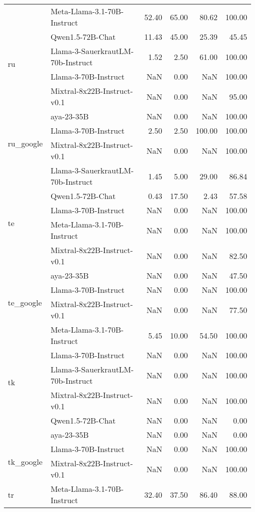 \begin{tabular}{llrrrr}
\cline{1-6}
\multirow[t]{6}{*}{ru} & Meta-Llama-3.1-70B-Instruct & 52.40 & 65.00 & 80.62 & 100.00 \\
 & Qwen1.5-72B-Chat & 11.43 & 45.00 & 25.39 & 45.45 \\
 & Llama-3-SauerkrautLM-70b-Instruct & 1.52 & 2.50 & 61.00 & 100.00 \\
 & Llama-3-70B-Instruct & NaN & 0.00 & NaN & 100.00 \\
 & Mixtral-8x22B-Instruct-v0.1 & NaN & 0.00 & NaN & 95.00 \\
 & aya-23-35B & NaN & 0.00 & NaN & 100.00 \\
\cline{1-6}
\multirow[t]{2}{*}{ru_google} & Llama-3-70B-Instruct & 2.50 & 2.50 & 100.00 & 100.00 \\
 & Mixtral-8x22B-Instruct-v0.1 & NaN & 0.00 & NaN & 100.00 \\
\cline{1-6}
\multirow[t]{6}{*}{te} & Llama-3-SauerkrautLM-70b-Instruct & 1.45 & 5.00 & 29.00 & 86.84 \\
 & Qwen1.5-72B-Chat & 0.43 & 17.50 & 2.43 & 57.58 \\
 & Llama-3-70B-Instruct & NaN & 0.00 & NaN & 100.00 \\
 & Meta-Llama-3.1-70B-Instruct & NaN & 0.00 & NaN & 100.00 \\
 & Mixtral-8x22B-Instruct-v0.1 & NaN & 0.00 & NaN & 82.50 \\
 & aya-23-35B & NaN & 0.00 & NaN & 47.50 \\
\cline{1-6}
\multirow[t]{2}{*}{te_google} & Llama-3-70B-Instruct & NaN & 0.00 & NaN & 100.00 \\
 & Mixtral-8x22B-Instruct-v0.1 & NaN & 0.00 & NaN & 77.50 \\
\cline{1-6}
\multirow[t]{6}{*}{tk} & Meta-Llama-3.1-70B-Instruct & 5.45 & 10.00 & 54.50 & 100.00 \\
 & Llama-3-70B-Instruct & NaN & 0.00 & NaN & 100.00 \\
 & Llama-3-SauerkrautLM-70b-Instruct & NaN & 0.00 & NaN & 100.00 \\
 & Mixtral-8x22B-Instruct-v0.1 & NaN & 0.00 & NaN & 100.00 \\
 & Qwen1.5-72B-Chat & NaN & 0.00 & NaN & 0.00 \\
 & aya-23-35B & NaN & 0.00 & NaN & 0.00 \\
\cline{1-6}
\multirow[t]{2}{*}{tk_google} & Llama-3-70B-Instruct & NaN & 0.00 & NaN & 100.00 \\
 & Mixtral-8x22B-Instruct-v0.1 & NaN & 0.00 & NaN & 100.00 \\
\cline{1-6}
\multirow[t]{6}{*}{tr} & Meta-Llama-3.1-70B-Instruct & 32.40 & 37.50 & 86.40 & 88.00 \\

\end{tabular}
